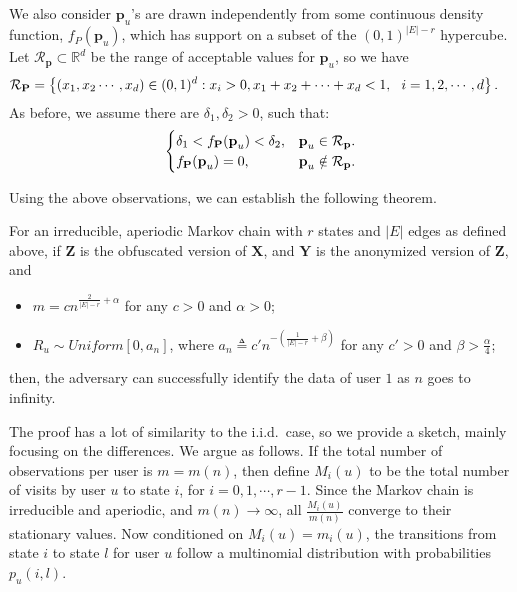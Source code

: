 We also consider $\textbf{p}_u$'s are drawn independently from some continuous density function, $f_P(\textbf{p}_u)$, which has support on a subset of the $(0,1)^{|E|-r}$ hypercube. Let $\mathcal{R}_{\textbf{p}} \subset \mathbb{R}^{d}$ be the range of acceptable values for $\textbf{p}_{u}$, so we have
\begin{align}
\nonumber  \mathcal{R}_{\textbf{P}} &= \left\{ (x_1,x_2 \cdots, x_{d}) \in (0,1)^{d}: x_i > 0 , x_1+x_2+\cdots+x_{d} < 1,\ \ i=1,2,\cdots, d\right\}.
\end{align}
As before, we assume there are $ \delta_1, \delta_2 >0$, such that:
\begin{equation}
\begin{cases}
\nonumber    \delta_1<f_{\textbf{P}}(\textbf{p}_u) <\delta_2, & \textbf{p}_u \in \mathcal{R}_{\textbf{p}}.\\
    f_{\textbf{P}}(\textbf{p}_u)=0, &  \textbf{p}_u \notin \mathcal{R}_{\textbf{p}}.
\end{cases}
\end{equation}

Using the above observations, we can establish the following theorem.


\begin{thm}\label{markov_thm}
For an irreducible, aperiodic Markov chain with $r$ states and $|E|$ edges as defined above, if $\textbf{Z}$ is the obfuscated version of $\textbf{X}$, and $\textbf{Y}$ is the anonymized version of $\textbf{Z}$, and
\begin{itemize}
 \item $m =cn^{\frac{2}{|E|-r} +  \alpha}$ for any $c>0$ and $\alpha>0$;
\item $R_u \sim Uniform [0, a_n]$, where $a_n \triangleq c'n^{-\left(\frac{1}{|E|-r}+\beta \right)}$ for any $c'>0$ and $\beta>\frac{\alpha}{4}$;
\end{itemize}
then, the adversary can successfully identify the data of user $1$ as $n$ goes to infinity. 
\end{thm}
The proof has a lot of similarity to the i.i.d.\ case, so we provide a sketch, mainly focusing on the differences. We argue as follows. If the total number of observations per user is $m=m(n)$, then define $M_i(u)$ to be the total number of visits by user $u$ to state $i$, for $i=0, 1, \cdots, r-1$. Since the Markov chain is irreducible and aperiodic, and $m(n) \rightarrow \infty$, all $\frac{M_i(u)}{m(n)}$ converge to their stationary values. Now conditioned on $M_i(u)=m_i(u)$, the transitions from state $i$ to state $l$ for user $u$ follow a multinomial distribution with probabilities $p_u(i,l)$.


